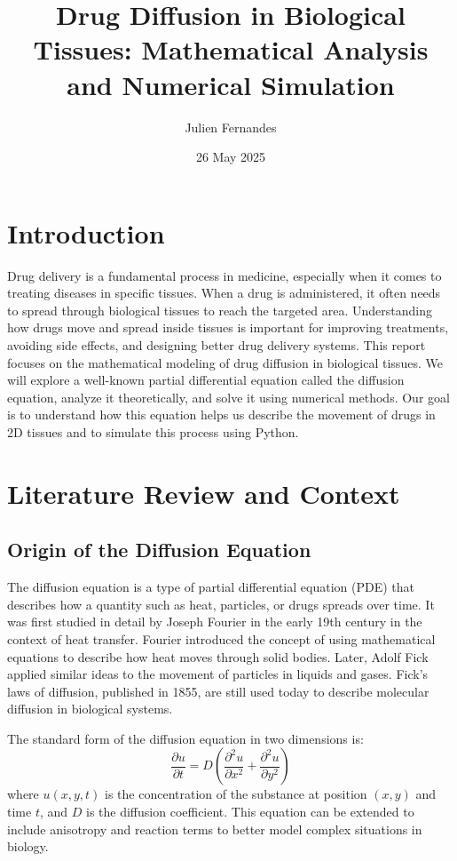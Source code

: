 \documentclass[11pt, a4paper]{article}
\title{Drug Diffusion in Biological Tissues: Mathematical Analysis and Numerical Simulation}
\author{Julien Fernandes}
\date{26 May 2025}
\begin{document}
\maketitle
\hypersetup{linktoc=all}
\tableofcontents
\newpage

\section{Introduction}
Drug delivery is a fundamental process in medicine, especially when it comes to treating diseases in specific tissues.
When a drug is administered, it often needs to spread through biological tissues to reach the targeted area.
Understanding how drugs move and spread inside tissues is important for improving treatments, avoiding side effects, and designing better drug delivery systems.
This report focuses on the mathematical modeling of drug diffusion in biological tissues. We will explore a well-known partial differential equation called the diffusion equation, analyze it theoretically, and solve it using numerical methods.
Our goal is to understand how this equation helps us describe the movement of drugs in 2D tissues and to simulate this process using Python.

\section{Literature Review and Context}

\subsection{Origin of the Diffusion Equation}
The diffusion equation is a type of partial differential equation (PDE) that describes how a quantity such as heat, particles, or drugs spreads over time.
It was first studied in detail by Joseph Fourier in the early 19th century in the context of heat transfer.
Fourier introduced the concept of using mathematical equations to describe how heat moves through solid bodies.
Later, Adolf Fick applied similar ideas to the movement of particles in liquids and gases. Fick’s laws of diffusion, published in 1855, are still used today to describe molecular diffusion in biological systems.

The standard form of the diffusion equation in two dimensions is:
\[
\frac{\partial u}{\partial t} = D \left( \frac{\partial^2 u}{\partial x^2} + \frac{\partial^2 u}{\partial y^2} \right)
\]
where \( u(x, y, t) \) is the concentration of the substance at position \((x, y)\) and time \(t\), and \(D\) is the diffusion coefficient. This equation can be extended to include anisotropy and reaction terms to better model complex situations in biology.
\end{document}
